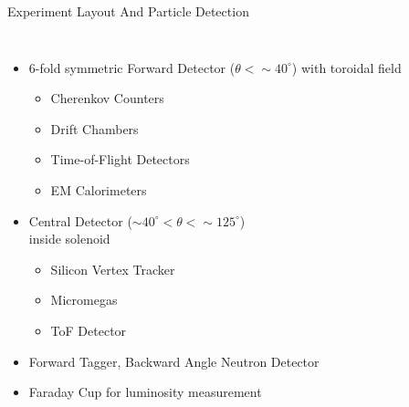 \documentclass[aspectratio=169]{beamer}
\begin{document}
\begin{frame}{Experiment Layout And Particle Detection} \label{frame:datasets3}
\vspace{-0.5cm}
        \begin{columns}[t, onlytextwidth]
                \begin{itemize}
                    \setlength\itemsep{.35em}
                    \item 6-fold symmetric Forward Detector ($\theta < \sim 40 ^{\circ}$) with toroidal field
                     \begin{itemize}
                    \setlength\itemsep{.25em}
                        \item Cherenkov Counters
                        \item Drift Chambers
                        \item Time-of-Flight Detectors
                        \item EM Calorimeters
                    \end{itemize}
                      \item Central Detector ($\sim40^{\circ} < \theta < \sim 125 ^{\circ}$) \\
                      inside solenoid
                     \begin{itemize}
                    \setlength\itemsep{.25em}
                        \item Silicon Vertex Tracker
                        \item Micromegas
                        \item ToF Detector

                    \end{itemize}
                    
                    \item Forward Tagger, Backward Angle Neutron Detector
                    \item Faraday Cup for luminosity measurement
                
            
                \end{itemize}
            
                \vspace{0.1cm}
                

\end{columns}
\end{frame}
\end{document}
